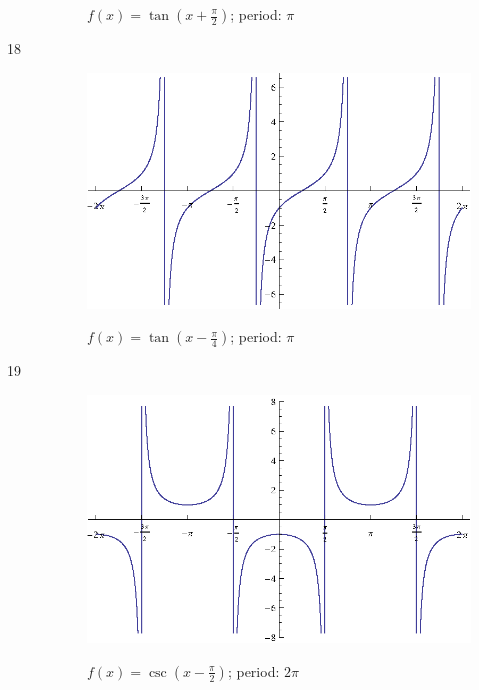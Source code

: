 \documentclass{exam}
\begin{document}
\begin{description}
\begin{figure}[H]
          $f(x) = \tan \left( x + \frac{\pi}{2} \right)$; period: $\pi$
        \end{figure}

      \item[18]
        \begin{figure}[H]
          \centering
          \includegraphics[scale=0.9]{exercise18.eps}

          $f(x) = \tan \left( x - \frac{\pi}{4} \right)$; period: $\pi$
        \end{figure}

      \item[19]
        \begin{figure}[H]
          \centering
          \includegraphics[scale=0.9]{exercise19.eps}

          $f(x) = \csc \left( x - \frac{\pi}{2} \right)$; period: $2 \pi$
        \end{figure}


\end{description}
\end{document}
